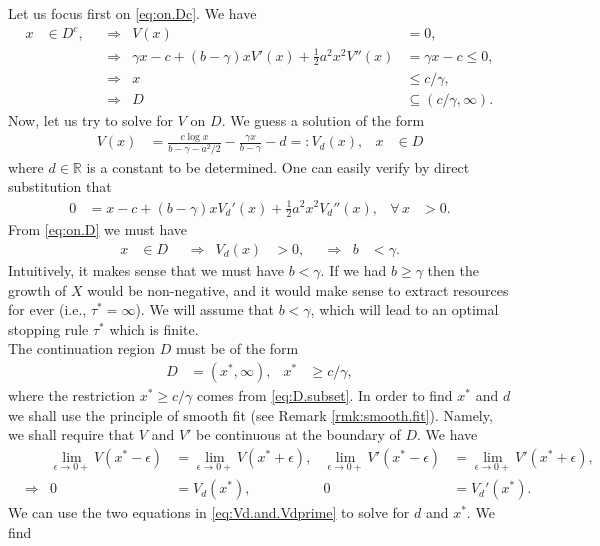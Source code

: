 \documentclass[12pt]{book}
\let\varepsilon\epsilon
\numberwithin{equation}{chapter}
\theoremstyle{plain}
\numberwithin{theorem}{section}
\theoremstyle{definition}
\numberwithin{exercise}{chapter}
\newcommand{\<}{\langle}
\renewcommand{\>}{\rangle}
\renewcommand{\(}{\left(}
\renewcommand{\)}{\right)}
\renewcommand{\[}{\left[}
\renewcommand{\]}{\right]}
\newcommand\Rb{\mathds{R}}
\newcommand\eps{\varepsilon}
\newcommand\gam{\gamma}
\begin{document}
Let us focus first on \eqref{eq:on.Dc}.  We have
\begin{align}
x  
	&\in D^c , &
	&\Rightarrow&
V(x)
	&=	0 , \\  & &
	&\Rightarrow&
\gam x - c + (b - \gam) x V'(x) + \tfrac{1}{2} a^2 x^2 V''(x)
	&=	\gam x - c \leq 0 , \\ & &
	&\Rightarrow&
x
	&\leq  c / \gam , \\ & &
	&\Rightarrow&
D
	&\subseteq ( c/\gam , \infty) . \label{eq:D.subset}
\end{align}
Now, let us try to solve for $V$ on $D$.  We guess a solution of the form
\begin{align}
V(x)
	&=	\frac{ c \log x }{ b - \gam - a^2/2 } - \frac{\gam x}{b - \gam} - d =: V_d(x), &
x
	&\in D
\end{align}
where $d \in \Rb$ is a constant to be determined.  One can easily verify by direct substitution that
\begin{align}
0
	&=	x - c + (b - \gam) x V_d'(x) + \tfrac{1}{2} a^2 x^2 V_d''(x) , &
\forall \, x 
	&> 0 .
\end{align}
From \eqref{eq:on.D} we must have
\begin{align}
x 
	&\in D &
	&\Rightarrow&
V_d(x)
	&> 0 , &
	&\Rightarrow&
b
	&< \gam .
\end{align}
Intuitively, it makes sense that we must have $b<\gam$.  If we had $b \geq \gam$ then the growth of $X$ would be non-negative, and it would make sense to extract resources for ever (i.e., $\tau^* = \infty$).  We will assume that $b < \gam$, which will lead to an optimal stopping rule $\tau^*$ which is finite.
\\[0.5em]
The continuation region $D$ must be of the form
\begin{align}
D
	&=	(x^*, \infty) , &
x^*
	&\geq c/\gam ,
\end{align}
where the restriction $x^* \geq c/\gam$ comes from \eqref{eq:D.subset}.
In order to find $x^*$ and  $d$ we shall use the principle of smooth fit (see Remark \ref{rmk:smooth.fit}).  Namely, we shall require that $V$ and $V'$ be continuous at the boundary of $D$.  We have
\begin{align}
&&
\lim_{\eps \to 0+} V(x^*-\eps)
	&= \lim_{\eps \to 0+}V(x^*+\eps) , &
\lim_{\eps \to 0+}V'(x^*-\eps)
	&= \lim_{\eps \to 0+}V'(x^*+\eps) , \\
&\Rightarrow&
0
	&=	V_d(x^*) , &
0
	&=	V_d'(x^*)  . \label{eq:Vd.and.Vdprime}
\end{align}  
We can use the two equations in \eqref{eq:Vd.and.Vdprime} to solve for $d$ and $x^*$.  We find
\end{document}
